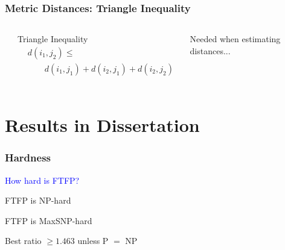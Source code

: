\documentclass[hyperref,dvipsnames,svgnames,compress]{beamer}
\begin{document}
\begin{frame}
  \frametitle{Metric Distances: Triangle Inequality}
  \begin{columns}
    \begin{center}
    \end{center}

    \begin{block}{Triangle Inequality}
      \begin{align*}
    &d(i_1, j_2) \leq\\
    &\qquad d(i_1, j_1) + d(i_2, j_1) + d(i_2, j_2)\\
  \end{align*}
    \end{block}
    \begin{block}{}
      \color{blue}
      Needed when estimating distances...
    \end{block}
  \end{columns}

\end{frame}

\section[Results]{Results in Dissertation}

\begin{frame}
  \frametitle{Hardness}

  \begin{center}
  \huge{\textcolor{blue}{How hard is FTFP?}}
  \end{center}

  \begin{block}{}
    FTFP is NP-hard
  \end{block}

  \begin{block}{}
    FTFP is MaxSNP-hard
  \end{block}

  \begin{block}{}
    Best ratio $\geq 1.463$ unless P $=$ NP
  \end{block}
\end{frame}
\end{document}

